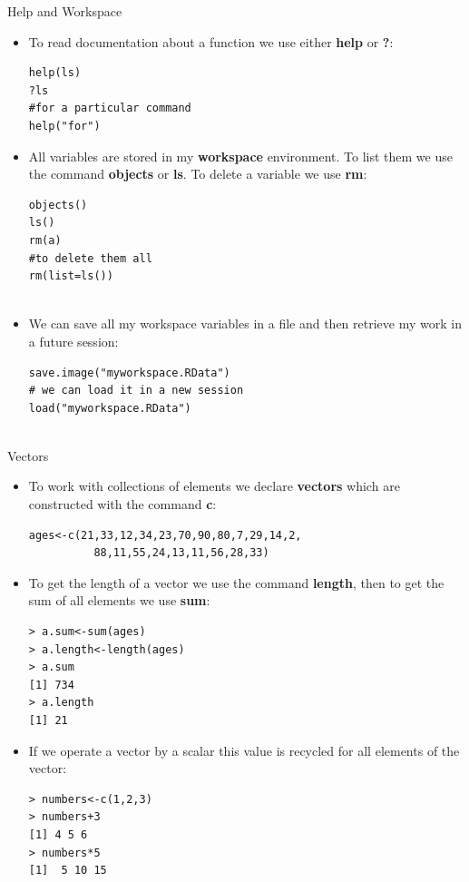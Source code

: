\documentclass[handout]{beamer}
\begin{document}
\begin{frame}[fragile]{Help and Workspace}
\scriptsize{
\begin{itemize}
 \item To read documentation about a function we use either \textbf{help} or \textbf{?}:
\begin{verbatim}
help(ls)
?ls
#for a particular command
help("for")
\end{verbatim}

\item All variables are stored in my \textbf{workspace} environment. To list them we use the command \textbf{objects} or \textbf{ls}. To delete a variable we use \textbf{rm}:

\begin{verbatim}
objects()
ls()
rm(a)
#to delete them all
rm(list=ls())
 
\end{verbatim}


\item We can save all my workspace variables in a file and then retrieve my work in a future session:
\begin{verbatim}
save.image("myworkspace.RData")
# we can load it in a new session
load("myworkspace.RData")
 
\end{verbatim}


 
 
 
 \end{itemize}



}
 
 
\end{frame}

\begin{frame}[fragile]{Vectors}
\scriptsize{
\begin{itemize}
 \item To work with collections of elements we declare \textbf{vectors} which are constructed with the command \textbf{c}:
 \begin{verbatim}
ages<-c(21,33,12,34,23,70,90,80,7,29,14,2,
          88,11,55,24,13,11,56,28,33)
 \end{verbatim}
 \item To get the length of a vector we use the command \textbf{length}, then to get the sum of all elements we use \textbf{sum}:
 \begin{verbatim}
> a.sum<-sum(ages)
> a.length<-length(ages)
> a.sum
[1] 734
> a.length
[1] 21
 \end{verbatim}
 
\item If we operate a vector by a scalar this value is recycled for all elements of the vector:
 \begin{verbatim}
> numbers<-c(1,2,3)
> numbers+3
[1] 4 5 6
> numbers*5
[1]  5 10 15
 \end{verbatim}
\end{itemize}




}
 
 
\end{frame}
\end{document}
